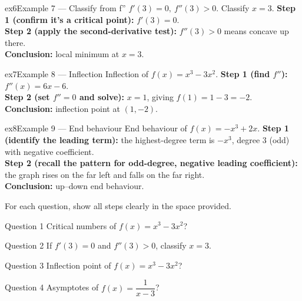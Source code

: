 \documentclass[11pt]{article}
\begin{document}
\begin{example}{ex6}{Example 7 --- Classify from f''}
$f'(3)=0,\ f''(3)>0$. Classify $x=3$.\soln
\textbf{Step 1 (confirm it's a critical point):} $f'(3)=0$.\\[3pt]
\textbf{Step 2 (apply the second-derivative test):} $f''(3)>0$ means concave up there.\\[3pt]
\textbf{Conclusion:} local minimum at $x=3$.
\end{example}

\begin{example}{ex7}{Example 8 --- Inflection}
Inflection of $f(x)=x^3-3x^2$.\soln
\textbf{Step 1 (find $f''$):} $f''(x)=6x-6$.\\[3pt]
\textbf{Step 2 (set $f''=0$ and solve):} $x=1$, giving $f(1)=1-3=-2$.\\[3pt]
\textbf{Conclusion:} inflection point at $(1,-2)$.
\end{example}

\begin{example}{ex8}{Example 9 --- End behaviour}
End behaviour of $f(x)=-x^3+2x$.\soln
\textbf{Step 1 (identify the leading term):} the highest-degree term is $-x^3$, degree $3$ (odd) with negative coefficient.\\[3pt]
\textbf{Step 2 (recall the pattern for odd-degree, negative leading coefficient):} the graph rises on the far left and falls on the far right.\\[3pt]
\textbf{Conclusion:} up--down end behaviour.
\end{example}

\clearpage
{}
For each question, show all steps clearly in the space provided.

\begin{qbox}{Question 1}
Critical numbers of $f(x)=x^3-3x^2$?\workspace{2.4cm}
\end{qbox}

\begin{qbox}{Question 2}
If $f'(3)=0$ and $f''(3)>0$, classify $x=3$.\workspace{2.4cm}
\end{qbox}

\begin{qbox}{Question 3}
Inflection point of $f(x)=x^3-3x^2$?\workspace{2.4cm}
\end{qbox}

\begin{qbox}{Question 4}
Asymptotes of $f(x)=\dfrac1{x-3}$?\workspace{2.4cm}
\end{qbox}
\end{document}
